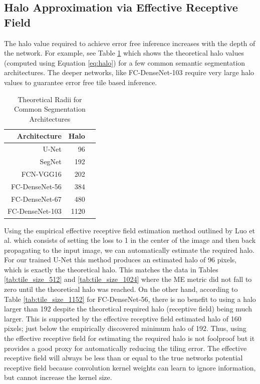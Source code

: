 \documentclass[10pt, indentfirst]{article}
\begin{document}
\subsection{Halo Approximation via Effective Receptive Field}

The halo value required to achieve error free inference increases with the depth of the network. For example, see Table \ref{tab:common_radii} which shows the theoretical halo values (computed using Equation \ref{eq:halo}) for a few common semantic segmentation architectures. The deeper networks, like FC-DenseNet-103 require very large halo values to guarantee error free tile based inference.

\begin{table}
	\centering
	\caption{Theoretical Radii for Common Segmentation Architectures}
	\label{tab:common_radii}
	\begin{tabular}{r|r|r}
		Architecture & Halo &  \\ 
		\hline
		U-Net \citep{Ronneberger2015a} & 96 \\
		SegNet \citep{Badrinarayanan2015a} & 192 \\
		FCN-VGG16 \citep{Long2015} & 202 \\
		FC-DenseNet-56 \citep{Jegou2017} & 384 \\
		FC-DenseNet-67 \citep{Jegou2017} & 480 \\
		FC-DenseNet-103 \citep{Jegou2017} & 1120 \\
	\end{tabular}
\end{table}

Using the empirical effective receptive field estimation method outlined by Luo et al. \citep{Luo2016} which consists of setting the loss to 1 in the center of the image and then back propagating to the input image, we can automatically estimate the required halo. For our trained U-Net \citep{Ronneberger2015a} this method produces an estimated halo of 96 pixels, which is exactly the theoretical halo. This matches the data in Tables \ref{tab:tile_size_512} and \ref{tab:tile_size_1024} where the ME metric did not fall to zero until the theoretical halo was reached. On the other hand, according to Table \ref{tab:tile_size_1152} for FC-DenseNet-56, there is no benefit to using a halo larger than 192 despite the theoretical required halo (receptive field) being much larger. This is supported by the effective receptive field estimated halo of 160 pixels; just below the empirically discovered minimum halo of 192. Thus, using the effective receptive field for estimating the required halo is not foolproof but it provides a good proxy for automatically reducing the tiling error. 
The effective receptive field will always be less than or equal to the true networks potential receptive field because convolution kernel weights can learn to ignore information, but cannot increase the kernel size.
\end{document}
